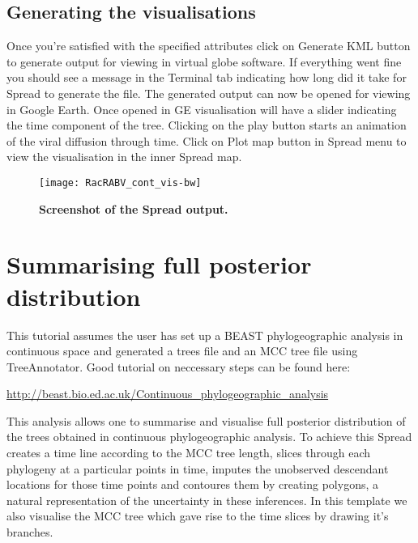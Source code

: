 \subsection{Generating the visualisations}

Once you're satisfied with the specified attributes click on Generate
KML button to generate output for viewing in virtual globe software.
If everything went fine you should see a message in the Terminal tab
indicating how long did it take for Spread to generate the file. The
generated output can now be opened for viewing in Google Earth. Once
opened in GE visualisation will have a slider indicating the time
component of the tree. Clicking on the play button starts an animation
of the viral diffusion through time. Click on Plot map button in Spread
menu to view the visualisation in the inner Spread map.

\begin{figure}[h!]
\begin{centering}
\texttt{[image: RacRABV\_cont\_vis-bw]}
\caption{
{ \footnotesize 
{\bf Screenshot of the Spread output.}
} %
}
\label{fig:RacRABV_cont_vis}
\par\end{centering}
\end{figure}

\section{Summarising full posterior distribution}

This tutorial assumes the user has set up a BEAST phylogeographic
analysis in continuous space and generated a trees file and an MCC
tree file using TreeAnnotator. Good tutorial on neccessary steps can
be found here:

\url{http://beast.bio.ed.ac.uk/Continuous_phylogeographic_analysis}

\noindent
This analysis allows one to summarise and visualise full posterior
distribution of the trees obtained in continuous phylogeographic analysis.
To achieve this Spread creates a time line according to the MCC tree
length, slices through each phylogeny at a particular points in time,
imputes the unobserved descendant locations for those time points
and contoures them by creating polygons, a natural representation
of the uncertainty in these inferences. In this template we also visualise
the MCC tree which gave rise to the time slices by drawing it's branches.

